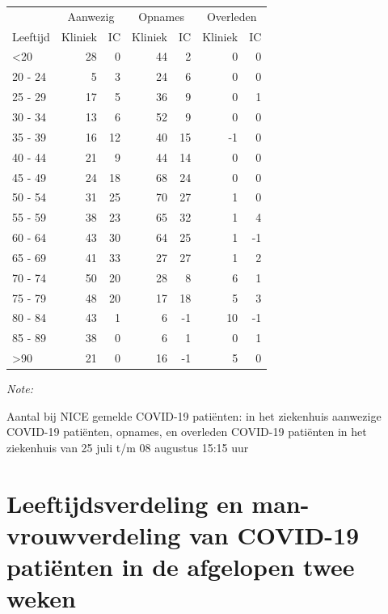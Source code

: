 \documentclass[
  english,
  man,floatsintext]{apa6}
\begin{document}
\begin{table}
\centering\begingroup\fontsize{10}{12}\selectfont

\begin{threeparttable}
\begin{tabular}{lrrrrrr}
\toprule
\multicolumn{1}{c}{ } & \multicolumn{2}{c}{Aanwezig} & \multicolumn{2}{c}{Opnames} & \multicolumn{2}{c}{Overleden} \\
\cmidrule(l{3pt}r{3pt}){2-3} \cmidrule(l{3pt}r{3pt}){4-5} \cmidrule(l{3pt}r{3pt}){6-7}
Leeftijd & Kliniek & IC & Kliniek & IC & Kliniek & IC\\
\midrule
<20 & 28 & 0 & 44 & 2 & 0 & 0\\
20 - 24 & 5 & 3 & 24 & 6 & 0 & 0\\
25 - 29 & 17 & 5 & 36 & 9 & 0 & 1\\
30 - 34 & 13 & 6 & 52 & 9 & 0 & 0\\
35 - 39 & 16 & 12 & 40 & 15 & -1 & 0\\
40 - 44 & 21 & 9 & 44 & 14 & 0 & 0\\
45 - 49 & 24 & 18 & 68 & 24 & 0 & 0\\
50 - 54 & 31 & 25 & 70 & 27 & 1 & 0\\
55 - 59 & 38 & 23 & 65 & 32 & 1 & 4\\
60 - 64 & 43 & 30 & 64 & 25 & 1 & -1\\
65 - 69 & 41 & 33 & 27 & 27 & 1 & 2\\
70 - 74 & 50 & 20 & 28 & 8 & 6 & 1\\
75 - 79 & 48 & 20 & 17 & 18 & 5 & 3\\
80 - 84 & 43 & 1 & 6 & -1 & 10 & -1\\
85 - 89 & 38 & 0 & 6 & 1 & 0 & 1\\
>90 & 21 & 0 & 16 & -1 & 5 & 0\\
\bottomrule
\end{tabular}
\begin{tablenotes}
\item \textit{Note: } 
\item Aantal bij NICE gemelde COVID-19 patiënten: in het ziekenhuis aanwezige COVID-19 patiënten, opnames, en overleden COVID-19 patiënten in het ziekenhuis van 25 juli t/m 08 augustus 15:15 uur
\end{tablenotes}
\end{threeparttable}
\endgroup{}
\end{table}

\newpage

\hypertarget{leeftijdsverdeling-en-man-vrouwverdeling-van-covid-19-patiuxebnten-in-de-afgelopen-twee-weken}{%
\section{Leeftijdsverdeling en man-vrouwverdeling van COVID-19 patiënten in de afgelopen twee weken}\label{leeftijdsverdeling-en-man-vrouwverdeling-van-covid-19-patiuxebnten-in-de-afgelopen-twee-weken}}
\end{document}
